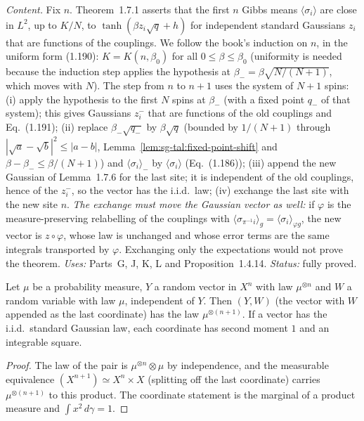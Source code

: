 \emph{Content.}  Fix $n$.  Theorem~1.7.1 asserts that the first $n$ Gibbs means $\langle\sigma_i\rangle$ are close in $L^2$, up to $K/N$, to $\tanh(\beta z_i\sqrt q+h)$ for independent standard Gaussians $z_i$ that are functions of the couplings.
We follow the book's induction on $n$, in the uniform form (1.190): $K=K(n,\beta_0)$ for all $0\le\beta\le\beta_0$ (uniformity is needed because the induction step applies the hypothesis at $\beta_-=\beta\sqrt{N/(N+1)}$, which moves with $N$).
The step from $n$ to $n+1$ uses the system of $N+1$ spins:
(i) apply the hypothesis to the first $N$ spins at $\beta_-$ (with a fixed point $q_-$ of that system); this gives Gaussians $z^-_i$ that are functions of the old couplings and Eq.~(1.191);
(ii) replace $\beta_-\sqrt{q_-}$ by $\beta\sqrt q$ (bounded by $1/(N+1)$ through $|\sqrt a-\sqrt b|^2\le|a-b|$, Lemma~\ref{lem:sg-tal:fixed-point-shift} and $\beta-\beta_-\le\beta/(N+1)$) and $\langle\sigma_i\rangle_-$ by $\langle\sigma_i\rangle$ (Eq.~(1.186));
(iii) append the new Gaussian of Lemma~1.7.6 for the last site; it is independent of the old couplings, hence of the $z^-_i$, so the vector has the i.i.d.\ law;
(iv) exchange the last site with the new site $n$.
\emph{The exchange must move the Gaussian vector as well:} if $\varphi$ is the measure-preserving relabelling of the couplings with $\langle\sigma_{\pi^{-1}i}\rangle_g=\langle\sigma_i\rangle_{\varphi g}$, the new vector is $z\circ\varphi$, whose law is unchanged and whose error terms are the same integrals transported by $\varphi$.  Exchanging only the expectations would not prove the theorem.
\emph{Uses:} Parts~G, J, K, L and Proposition~1.4.14.  \emph{Status:} fully proved.

\begin{lemma}
\label{lem:sg-tal:append-coordinate}
  \leanok
{}
Let $\mu$ be a probability measure, $Y$ a random vector in $X^n$ with law $\mu^{\otimes n}$ and $W$ a random variable with law $\mu$, independent of $Y$.  Then $(Y,W)$ (the vector with $W$ appended as the last coordinate) has the law $\mu^{\otimes(n+1)}$.  If a vector has the i.i.d.\ standard Gaussian law, each coordinate has second moment $1$ and an integrable square.
\end{lemma}
\begin{proof}
  \leanok
The law of the pair is $\mu^{\otimes n}\otimes\mu$ by independence, and the measurable equivalence $(X^{n+1})\simeq X^n\times X$ (splitting off the last coordinate) carries $\mu^{\otimes(n+1)}$ to this product.  The coordinate statement is the marginal of a product measure and $\int x^2\,d\gamma=1$.
\end{proof}

